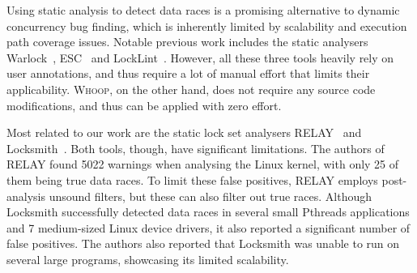 Using static analysis to detect data races is a promising alternative to dynamic concurrency bug finding, which is inherently limited by scalability and execution path coverage issues. Notable previous work includes the static analysers Warlock~\cite{sterling1993warlock}, ESC~\cite{detlefs1998extended} and LockLint~\cite{oracle2010locklint}. However, all these three tools heavily rely on user annotations, and thus require a lot of manual effort that limits their applicability. \textsc{Whoop}, on the other hand, does not require any source code modifications, and thus can be applied with zero effort.

Most related to our work are the static lock set analysers RELAY~\cite{voung2007relay} and Locksmith~\cite{pratikakis2006locksmith}. Both tools, though, have significant limitations. The authors of RELAY found 5022 warnings when analysing the Linux kernel, with only 25 of them being true data races. To limit these false positives, RELAY employs post-analysis unsound filters, but these can also filter out true races. Although Locksmith successfully detected data races in several small Pthreads applications and 7 medium-sized Linux device drivers, it also reported a significant number of false positives. The authors also reported that Locksmith was unable to run on several large programs, showcasing its limited scalability.